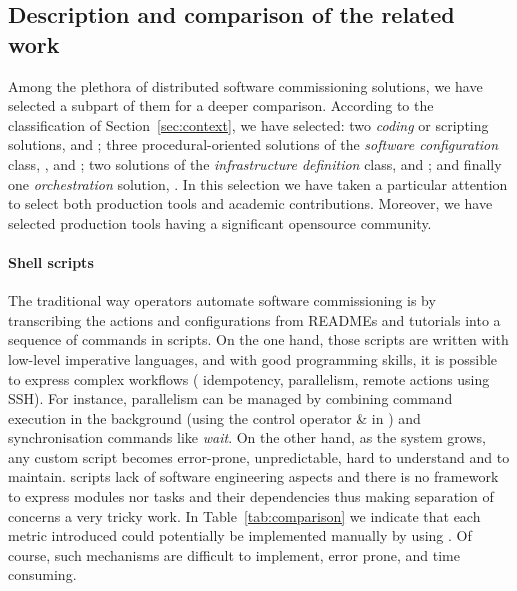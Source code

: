 \subsection{Description and comparison of the related work}

Among the plethora of distributed software commissioning solutions, we
have selected a subpart of them for a deeper comparison. According to
the classification of Section~\ref{sec:context}, we have selected: two
\emph{coding} or scripting solutions, \shell and \fractal; three
procedural-oriented solutions of the \emph{software configuration}
class, \ansible, \deployware and \aeolus; two solutions of the
\emph{infrastructure definition} class, \juju and \tosca; and finally
one \emph{orchestration} solution, \kubernetes. In this selection we
have taken a particular attention to select both production tools and
academic contributions. Moreover, we have selected production tools
having a significant opensource community.

\paragraph{Shell scripts}
The traditional way operators automate software commissioning is by
transcribing the actions and configurations from READMEs and tutorials
into a sequence of commands in \shell scripts. On the one hand, those
scripts are written with low-level imperative languages, and with good
programming skills, it is possible to express complex workflows (\eg
idempotency, parallelism, remote actions using \textsc{SSH}). For
instance, parallelism can be managed by combining command execution in
the background (\eg using the control operator \& in \bash) and
synchronisation commands like \emph{wait}. On the other hand, as the
system grows, any custom script becomes error-prone, unpredictable,
hard to understand and to maintain. \shell scripts lack of software
engineering aspects and there is no framework to express modules nor
tasks and their dependencies thus making separation of concerns a very
tricky work. In Table~\ref{tab:comparison} we indicate that each
metric introduced could potentially be implemented manually by using
\shell. Of course, such mechanisms are difficult to implement, error
prone, and time consuming.

